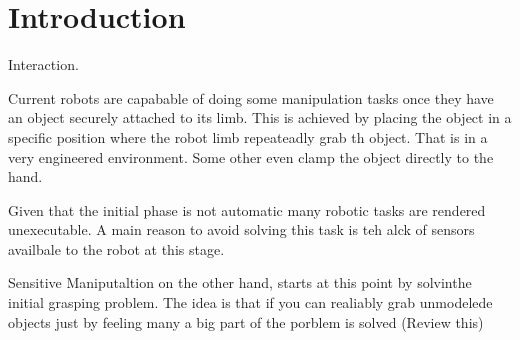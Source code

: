 \section{Introduction}
\label{sec:introduction}
Interaction.


Current robots are capabable of doing some manipulation tasks once they have an object securely attached to its limb. This is achieved by placing the object in a specific position where the robot limb repeateadly  grab th object. That is in a very engineered environment. Some other even clamp the object directly to the hand. 

Given that the initial phase is not automatic many robotic tasks are rendered unexecutable. A main reason to avoid solving this task is teh alck of sensors availbale to the robot at this stage.

Sensitive Maniputaltion on the other hand, starts at this point by solvinthe initial grasping problem. The idea is that if you can realiably grab unmodelede objects just by feeling many a big part of the porblem is solved  (Review this)




